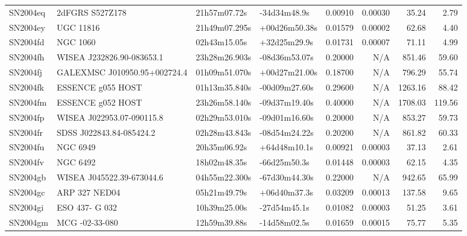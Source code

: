 \begin{longtable}{llllrrrr}
SN2004eq         &                 2dFGRS S527Z178 &    21h57m07.72s &    -34d34m48.9s &  0.00910 &  0.00030 &    35.24 &        2.79 \\
SN2004ey         &                       UGC 11816 &   21h49m07.295s &   +00d26m50.38s &  0.01579 &  0.00002 &    62.68 &        4.40 \\
SN2004fd         &                        NGC 1060 &    02h43m15.05s &    +32d25m29.9s &  0.01731 &  0.00007 &    71.11 &        4.99 \\
SN2004fh         &       WISEA J232826.90-083653.1 &   23h28m26.903s &   -08d36m53.07s &  0.20000 &      N/A &   851.46 &       59.60 \\
SN2004fj         &  GALEXMSC J010950.95+002724.4   &   01h09m51.070s &   +00d27m21.00s &  0.18700 &      N/A &   796.29 &       55.74 \\
SN2004fk         &               ESSENCE g055 HOST &   01h13m35.840s &   -00d09m27.60s &  0.29600 &      N/A &  1263.16 &       88.42 \\
SN2004fm         &               ESSENCE g052 HOST &   23h26m58.140s &   -09d37m19.40s &  0.40000 &      N/A &  1708.03 &      119.56 \\
SN2004fp         &       WISEA J022953.07-090115.8 &   02h29m53.010s &   -09d01m16.60s &  0.20000 &      N/A &   853.27 &       59.73 \\
SN2004fr         &        SDSS J022843.84-085424.2 &   02h28m43.843s &   -08d54m24.22s &  0.20200 &      N/A &   861.82 &       60.33 \\
SN2004fu         &                        NGC 6949 &    20h35m06.92s &    +64d48m10.1s &  0.00921 &  0.00003 &    37.13 &        2.61 \\
SN2004fv         &                        NGC 6492 &    18h02m48.35s &    -66d25m50.3s &  0.01448 &  0.00003 &    62.15 &        4.35 \\
SN2004gb         &       WISEA J045522.39-673044.6 &   04h55m22.300s &   -67d30m44.30s &  0.22000 &      N/A &   942.65 &       65.99 \\
SN2004gc         &                   ARP 327 NED04 &    05h21m49.79s &    +06d40m37.3s &  0.03209 &  0.00013 &   137.58 &        9.65 \\
SN2004gi         &                  ESO 437- G 032 &    10h39m25.00s &    -27d54m45.1s &  0.01082 &  0.00003 &    51.25 &        3.61 \\
SN2004gm         &                  MCG -02-33-080 &    12h59m39.88s &    -14d58m02.5s &  0.01659 &  0.00015 &    75.77 &        5.35 \\

\end{longtable}
